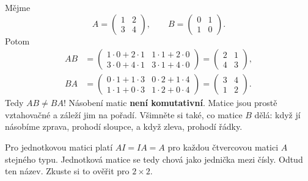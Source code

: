 \begin{example}
  Mějme
  \begin{equation*}
    A = \begin{pmatrix} 1 & 2\\ 3 & 4 \end{pmatrix},\qquad B = \begin{pmatrix} 0 & 1\\ 1 & 0 \end{pmatrix}.
  \end{equation*}
  Potom
  \begin{align*}
    AB &= \begin{pmatrix} 1\cdot 0 + 2\cdot 1 & 1\cdot 1 + 2\cdot 0\\ 3\cdot 0 + 4\cdot 1 & 3\cdot 1 + 4\cdot 0 \end{pmatrix} = \begin{pmatrix} 2 & 1\\ 4 & 3 \end{pmatrix},\\
    BA &= \begin{pmatrix} 0\cdot 1 + 1\cdot 3 & 0\cdot 2 + 1\cdot 4\\ 1\cdot 1 + 0\cdot 3 & 1\cdot 2 + 0\cdot 4 \end{pmatrix} = \begin{pmatrix} 3 & 4\\ 1 & 2 \end{pmatrix}.
  \end{align*}
  Tedy $AB\neq BA$! Násobení matic \textbf{není komutativní}. Matice jsou prostě vztahovačné a záleží jim na pořadí. Všimněte si také, co matice $B$ dělá: když jí násobíme zprava, prohodí sloupce, a když zleva, prohodí řádky.
\end{example}

\begin{note}
  Pro jednotkovou matici platí $AI = IA = A$ pro každou čtvercovou matici $A$ stejného typu. Jednotková matice se tedy chová jako jednička mezi čísly. Odtud ten název. Zkuste si to ověřit pro $2\times 2$.
\end{note}

